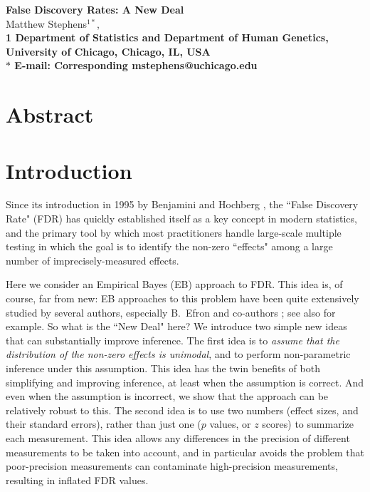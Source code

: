\documentclass[11pt]{article}
\date{}
\begin{document}
\begin{flushleft}
{\Large
\textbf{False Discovery Rates: A New Deal}
}
\\
Matthew Stephens$^{1*}$, 
\\
\bf{1} Department of Statistics and Department of Human Genetics, University of Chicago, Chicago, IL, USA
\\
$\ast$ E-mail: Corresponding mstephens@uchicago.edu
\end{flushleft}

\section*{Abstract}


\section*{Introduction}

Since its introduction in 1995 by Benjamini and Hochberg 
\cite{benjamini1995controlling}, the ``False Discovery Rate" (FDR) has quickly established itself
as a key concept in modern statistics, and the primary tool by which most practitioners handle large-scale multiple testing
in which the goal is to identify the non-zero ``effects" among a large number of imprecisely-measured effects.

Here we consider an Empirical Bayes (EB) approach to FDR. This idea is, of course, far from new:
EB approaches to this problem have been quite extensively studied by several authors, 
especially B.~Efron and co-authors 
\cite{efron2001empirical, efron2002empirical,efron2003robbins,efron2008microarrays,efron2010large}; 
see also \cite{kendziorski2003parametric,newton2004detecting, 
datta2005empirical,muralidharan2010empirical} for example.
So what is the ``New Deal" here? We introduce two simple new ideas that can substantially improve
inference. The first idea is to {\it assume that the distribution of the non-zero effects is unimodal}, and to perform
non-parametric inference under this assumption. This idea has the twin benefits of both simplifying and
improving inference, at least when the assumption is correct. And even when the assumption is incorrect, we show
that the approach can be relatively robust to this. The second idea is to use two numbers (effect sizes, and their standard errors), rather than just one ($p$ values, or $z$ scores)
 to summarize each measurement. This idea allows any differences in the precision of different measurements to be taken into account,
 and in particular avoids the problem that poor-precision measurements can contaminate high-precision measurements, resulting in inflated FDR values.
\end{document}
